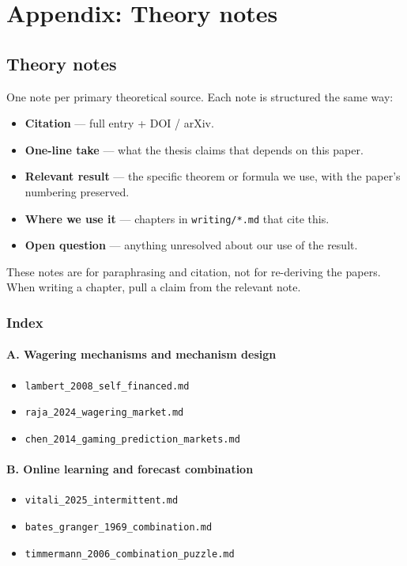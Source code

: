 \documentclass[11pt,a4paper,openany]{report}
\begin{document}
\appendix
\part*{Appendix: Theory notes}
\chapter{Theory notes}

One note per primary theoretical source. Each note is structured the
same way:

\begin{itemize}
  \item \textbf{Citation} — full entry + DOI / arXiv.
  \item \textbf{One-line take} — what the thesis claims that depends on this
    paper.
  \item \textbf{Relevant result} — the specific theorem or formula we use, with
    the paper's numbering preserved.
  \item \textbf{Where we use it} — chapters in \texttt{writing/*.md} that cite this.
  \item \textbf{Open question} — anything unresolved about our use of the result.
\end{itemize}

These notes are for paraphrasing and citation, not for re-deriving the
papers. When writing a chapter, pull a claim from the relevant note.

\section{Index}

\subsection{A. Wagering mechanisms and mechanism design}
\begin{itemize}
  \item \texttt{lambert\_2008\_self\_financed.md}
  \item \texttt{raja\_2024\_wagering\_market.md}
  \item \texttt{chen\_2014\_gaming\_prediction\_markets.md}
\end{itemize}

\subsection{B. Online learning and forecast combination}
\begin{itemize}
  \item \texttt{vitali\_2025\_intermittent.md}
  \item \texttt{bates\_granger\_1969\_combination.md}
  \item \texttt{timmermann\_2006\_combination\_puzzle.md}
\end{itemize}
\end{document}
